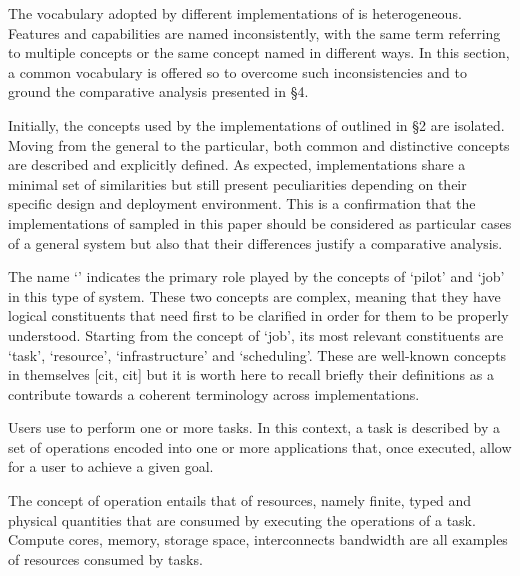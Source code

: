 \documentclass{sig-alternate}
\begin{document}

The vocabulary adopted by different implementations of \pilotjob is heterogeneous. Features and capabilities are named inconsistently, with the same term referring to multiple concepts or the same concept named in different ways. In this section, a common vocabulary is offered so to overcome such inconsistencies and to ground the comparative analysis presented in \S 4.


Initially, the concepts used by the implementations of \pilotjob outlined in \S 2 are isolated. Moving from the general to the particular, both common and distinctive concepts are described and explicitly defined. As expected, \pilotjob implementations share a minimal set of similarities but still present peculiarities depending on their specific design and deployment environment. This is a confirmation that the implementations of \pilotjob sampled in this paper should be considered as particular cases of a general \pilotjob system but also that their differences justify a comparative analysis.

The name `\pilotjob' indicates the primary role played by the concepts of `pilot' and `job' in this type of system. These two concepts are complex, meaning that they have logical constituents that need first to be clarified in order for them to be properly understood. Starting from the concept of `job', its most relevant constituents are `task', `resource', `infrastructure' and `scheduling'. These are well-known concepts in themselves [cit, cit] but it is worth here to recall briefly their definitions as a contribute towards a coherent terminology across \pilotjobs implementations. 


Users use \pilotjobs to perform one or more tasks. In this context, a task is described by a set of operations encoded into one or more applications that, once executed, allow for a user to achieve a given goal.


The concept of operation entails that of resources, namely finite, typed and physical quantities that are consumed by executing the operations of a task. Compute cores, memory, storage space,  interconnects bandwidth are all examples of resources consumed by tasks. 
\end{document}
